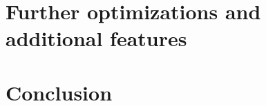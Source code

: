 \documentclass[journal]{IEEEtran}
\begin{document}
\section{Further optimizations and additional features}
\label{sec:oandf}

\section{Conclusion}
\label{sec:conclusion}


\end{document}
